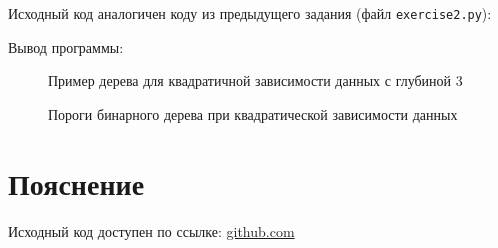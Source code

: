 \documentclass{article} %
\begin{document}
Исходный код аналогичен коду из предыдущего задания (файл \verb$exercise2.py$):

\clearpage
Вывод программы:


\begin{figure}[H]
    \centering
    \noindent{}
    \caption{Пример дерева для квадратичной зависимости данных с глубиной 3}
\end{figure}
\bigskip

\begin{figure}[H]
    \centering
    \noindent{}
    \caption{Пороги бинарного дерева при квадратической зависимости данных}
\end{figure}
\bigskip

\section{Пояснение}
Исходный код доступен по ссылке:
\href{https://github.com/SvichkarevAnatoly/Course-Python-Bioinformatics/tree/master/semester2/task6}
{github.com}
\end{document}
